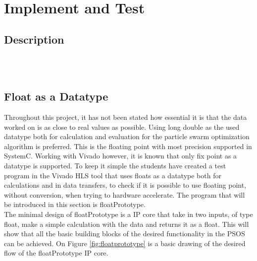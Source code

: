 \section{Implement and Test}

\subsection{Description}

\noindent{}
\\\\

\subsection{Float as a Datatype}\label{imp:floatprototype}
Throughout this project, it has not been stated how essential it is that the data worked on is as close to real values as possible. Using long double as the used datatype both for calculation and evaluation for the particle swarm optimization algorithm is preferred. This is the floating point with most precision supported in SystemC. Working with Vivado  however, it is known that only fix point as a datatype is supported. To keep it simple the students have created a test program in the Vivado HLS tool that uses floats as a datatype both for calculations and in data transfers, to check if it is possible to use floating point, without conversion, when trying to hardware accelerate. The program that will be introduced in this section is floatPrototype.\\

The minimal design of floatPrototype is a IP core that take in two inputs, of type float, make a simple calculation with the data and returns it as a float. This will show that all the basic building blocks of the desired functionality in the PSOS can be achieved. On Figure \ref{fig:floatprototype} is a basic drawing of the desired flow of the floatPrototype IP core.

